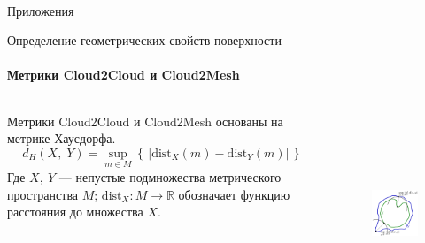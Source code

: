 \documentclass[aspectratio=169,xcolor=table]{beamer}
\newcommand{\fbckg}[1]{\usebackgroundtemplate{\texttt{[image: \#1]}}}%
\begin{document}
\begin{frame}[c]{}
    \framesubtitle{}
    \centering\LARGE Приложения
\end{frame}


\begin{frame}[t]{Определение геометрических свойств поверхности}
    \framesubtitle{Метрики Cloud2Cloud и Cloud2Mesh}


    \begin{columns}[T,onlytextwidth]
        \begin{column}{0.49\textwidth}
            Метрики Cloud2Cloud и Cloud2Mesh основаны на метрике Хаусдорфа.
            \begin{equation*}
                d_{H}(X,\;Y)=\sup _{m\in M}\left\{\,|\mathrm {dist} _{X}(m)-\mathrm {dist} _{Y}(m)|\,\right\}
            \end{equation*}
            Где $X,\ Y$ --- непустые подмножества метрического пространства $M$; $\mathrm {dist} _{X}\colon M\to \mathbb {R}$ обозначает функцию расстояния до множества $X$.
        \end{column}
        \begin{column}{0.49\textwidth}
            \vspace{-0.8cm}
            \begin{figure}[H]
                \centering\includegraphics[height=6cm,width=1\textwidth,keepaspectratio]{Hausdorff_distance_sample.svg.png}
                \label{fig:Hausdorff_distance_sample.svg.png}
            \end{figure}
        \end{column}
    \end{columns}
\end{frame}

\end{document}
